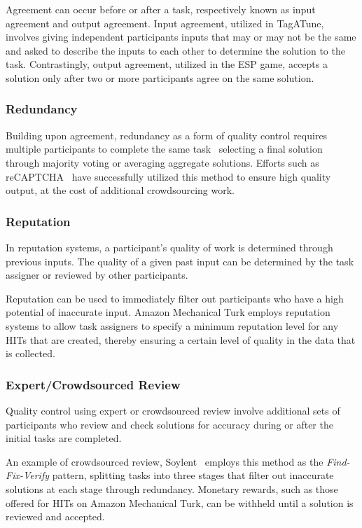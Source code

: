 \documentclass[10pt,twocolumn]{article}
\begin{document}
Agreement can occur before or after a task, respectively
known as input agreement and output agreement. Input agreement, utilized in 
TagATune, involves giving independent participants inputs that may or 
may not be the same and asked to describe the inputs to each other to 
determine the solution to the task. Contrastingly, output agreement, 
utilized in the ESP game, accepts a solution only after two or more 
participants agree on the same solution.


\subsubsection*{Redundancy}
Building upon agreement, redundancy as a form of quality control requires 
multiple participants to complete the same task~\cite{Sheng2008} selecting
a final solution through majority voting or averaging aggregate solutions.
Efforts such as reCAPTCHA~\cite{VonAhn2008} have successfully utilized this 
method to ensure high quality output, at the cost of additional crowdsourcing
work.


\subsubsection*{Reputation}
In reputation systems, a participant's quality of work is determined through 
previous inputs. The quality of a given past input can be determined by the 
task assigner or reviewed by other participants.

Reputation can be used to immediately filter out participants who have a 
high potential of inaccurate input. Amazon Mechanical Turk employs
reputation systems to allow task assigners to specify a minimum reputation 
level for any HITs that are created, thereby ensuring a certain level
of quality in the data that is collected.


\subsubsection*{Expert/Crowdsourced Review}
Quality control using expert or crowdsourced review involve additional
sets of participants who review and check solutions for accuracy during 
or after the initial tasks are completed.

An example of crowdsourced review, Soylent~\cite{Bernstein2010} employs 
this method as the \textit{Find-Fix-Verify} pattern, splitting tasks 
into three stages that filter out inaccurate solutions at each stage 
through redundancy. Monetary rewards, such as those offered for
HITs on Amazon Mechanical Turk, can be withheld until a solution
is reviewed and accepted.
\end{document}
